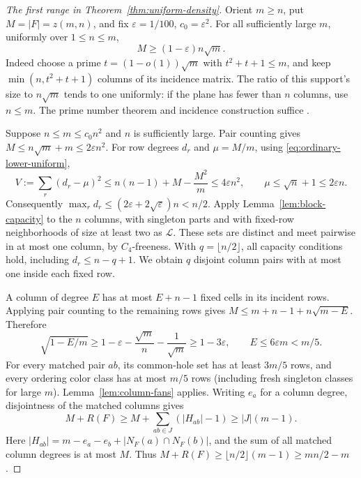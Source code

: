 \begin{proof}[The first range in Theorem~\ref{thm:uniform-density}]
Orient $m\ge n$, put $M=|F|=z(m,n)$, and fix
$\varepsilon=1/100$, $c_0=\varepsilon^2$.
For all sufficiently large $m$, uniformly over $1\le n\le m$,
\begin{equation}\label{eq:ordinary-lower-uniform}
 M\ge(1-\varepsilon)n\sqrt m.
\end{equation}
Indeed choose a prime $t=(1-o(1))\sqrt m$ with $t^2+t+1\le m$,
and keep $\min(n,t^2+t+1)$ columns of its incidence matrix.
The ratio of this support's size to $n\sqrt m$ tends to one uniformly:
if the plane has fewer than $n$ columns, use $n\le m$.
The prime number theorem and incidence construction suffice
\cite{Singer,Hadamard}.

Suppose $n\le m\le c_0n^2$ and $n$ is sufficiently large.
Pair counting gives $M\le n\sqrt m+m\le2\varepsilon n^2$.
For row degrees $d_r$ and $\mu=M/m$, using
\eqref{eq:ordinary-lower-uniform},
\[
 V:=\sum_r(d_r-\mu)^2
 \le n(n-1)+M-\frac{M^2}{m}\le4\varepsilon n^2,
 \qquad \mu\le\sqrt n+1\le2\varepsilon n.
\]
Consequently $\max_r d_r\le(2\varepsilon+2\sqrt\varepsilon)n<n/2$.
Apply Lemma~\ref{lem:block-capacity} to the $n$ columns, with singleton
parts and with fixed-row neighborhoods of size at least two as
$\mathcal L$. These sets are distinct and meet pairwise in at most one
column, by $C_4$-freeness. With $q=\lfloor n/2\rfloor$, all capacity
conditions hold, including $d_r\le n-q+1$.
We obtain $q$ disjoint column pairs with at most one inside each fixed row.

A column of degree $E$ has at most $E+n-1$ fixed cells in its incident
rows. Applying pair counting to the remaining rows gives
$M\le m+n-1+n\sqrt{m-E}$. Therefore
\[
 \sqrt{1-E/m}\ge1-\varepsilon-\frac{\sqrt m}{n}
                         -\frac1{\sqrt m}\ge1-3\varepsilon,
 \qquad E\le6\varepsilon m<m/5.
\]
For every matched pair $ab$, its common-hole set has at least $3m/5$
rows, and every ordering color class has at most $m/5$ rows (including
fresh singleton classes for large $m$). Lemma~\ref{lem:column-fans} applies.
Writing $e_a$ for a column degree, disjointness of the matched columns gives
\begin{equation}\label{eq:fan-exact-sum}
 M+R(F)\ge M+\sum_{ab\in J}(|H_{ab}|-1)
          \ge |J|(m-1).
\end{equation}
Here $|H_{ab}|=m-e_a-e_b+|N_F(a)\cap N_F(b)|$, and the sum of all
matched column degrees is at most $M$. Thus
$M+R(F)\ge\lfloor n/2\rfloor(m-1)\ge mn/2-m$.
\end{proof}


